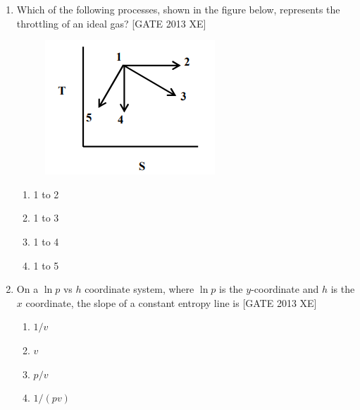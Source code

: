 \documentclass[journal,12pt,onecolumn]{IEEEtran}
\theoremstyle{remark}
\begin{document}
\begin{enumerate}
\item Which of the following processes, shown in the figure below, represents the throttling of an ideal gas? \hfill[GATE 2013 XE]

\begin{figure}[H]
    \centering
    \includegraphics[width=0.5\columnwidth]{figs/fig26.png}
    \caption{}
    \label{fig:fig26}
\end{figure}

\begin{multicols}{4}
\begin{enumerate}
\item 1 to 2
\item 1 to 3
\item 1 to 4
\item 1 to 5
\end{enumerate}
\end{multicols}

\item On a $\ln p$ vs $h$ coordinate system, where $\ln p$ is the $y$-coordinate and $h$ is the $x$ coordinate, the slope of a constant entropy line is \hfill[GATE 2013 XE]
\begin{multicols}{4}
\begin{enumerate}
\item $1/v$
\item $v$
\item $p/v$
\item $1/(pv)$
\end{enumerate}
\end{multicols}



\end{enumerate}
\end{document}
